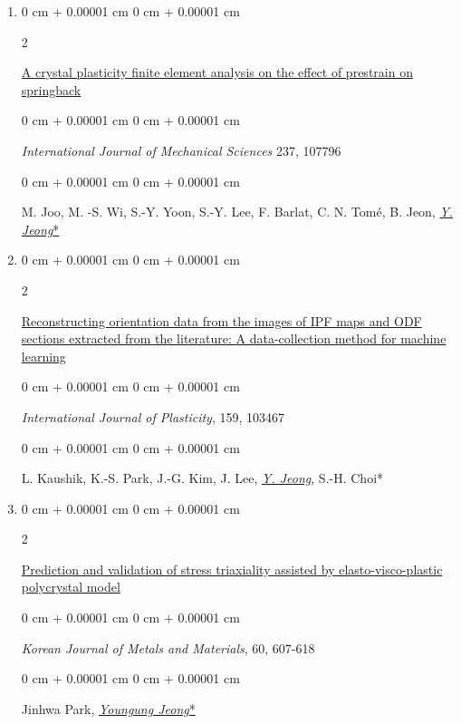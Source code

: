 \documentclass[10pt, letterpaper]{article}
\newenvironment{onecolentry}{
    \begin{adjustwidth}{
        0 cm + 0.00001 cm
    }{
        0 cm + 0.00001 cm
    }
}{
    \end{adjustwidth}
} %
\newenvironment{twocolentry}[2][]{
    \onecolentry
    \def\secondColumn{#2}
    \setcolumnwidth{\fill, 4.5 cm}
    \begin{paracol}{2}
}{
    \switchcolumn \raggedleft \secondColumn
    \end{paracol}
    \endonecolentry
} %
\begin{document}
\begin{enumerate}
        \item
        \begin{twocolentry}{2023}
            \href{https://doi.org/10.1016/j.ijmecsci.2022.107796}{A crystal plasticity finite element analysis on the effect of prestrain on springback}
        \end{twocolentry}
        \begin{onecolentry}
            {\it International Journal of Mechanical Sciences} 237, 107796
        \end{onecolentry}
        \begin{onecolentry}
            M. Joo, M. -S. Wi, S.-Y. Yoon, S.-Y. Lee, F. Barlat, C. N. Tomé, B. Jeon, {\underline{\textit{Y. Jeong}*}}
        \end{onecolentry}
        \vspace{0.10 cm}


        \item
        \begin{twocolentry}{2023}
            \href{https://doi.org/10.1016/j.ijplas.2022.103467}{Reconstructing orientation data from the images of IPF maps and ODF sections extracted from the literature: A data-collection method for machine learning}
        \end{twocolentry}
        \begin{onecolentry}
            {\it International Journal of Plasticity}, 159, 103467
        \end{onecolentry}
        \begin{onecolentry}
            L. Kaushik, K.-S. Park, J.-G. Kim, J. Lee, {\underline{\textit{Y. Jeong}}}, S.-H. Choi*
        \end{onecolentry}
        \vspace{0.10 cm}


        \item
        \begin{twocolentry}{2022}
            \href{http://dx.doi.org/10.3365/KJMM.2022.60.8.607}{Prediction and validation of stress triaxiality assisted by elasto-visco-plastic polycrystal model}
        \end{twocolentry}
        \begin{onecolentry}
            {\it Korean Journal of Metals and Materials}, 60, 607-618
        \end{onecolentry}
        \begin{onecolentry}
            Jinhwa Park, {\underline{\textit{Youngung Jeong}*}}
        \end{onecolentry}
        \vspace{0.10 cm}


\end{enumerate}
\end{document}
